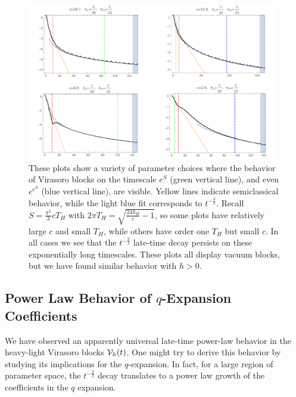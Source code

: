 \documentclass[12pt]{article}
\numberwithin{equation}{section}
\newcommand{\CV}{{\cal V}}
\begin{document}
\begin{figure}[h]
\begin{centering}
\includegraphics[width=0.98\textwidth]{VBlockESEES}
\caption{ These plots show a variety of parameter choices where the behavior of Virasoro blocks on the timescale $e^S$ (green vertical line), and even $e^{e^S}$ (blue vertical line), are visible.  Yellow lines indicate semiclassical behavior, while the light blue fit corresponds to $t^{-\frac{3}{2}}$.  Recall $S = \frac{\pi^2}{3} c T_H$ with $2 \pi T_H =  \sqrt{\frac{24 h_H}{c} - 1}$, so some plots have relatively large $c$ and small $T_H$, while others have order one $T_H$ but small $c$. In all cases we see that the $t^{-\frac{3}{2}}$ late-time decay persists on these exponentially long timescales.  These plots all display vacuum blocks, but we have found similar behavior with $h > 0$.}
\label{fig:VBlockESEES}
\end{centering}
\end{figure}

\subsection{Power Law Behavior of $q$-Expansion Coefficients}
\label{sec:CoeffPowerLaw}

We have observed an apparently universal late-time power-law behavior in the heavy-light Virasoro blocks $\CV_h(t)$.  One might try to derive this behavior by studying its implications for the $q$-expansion.  In fact, for a large region of parameter space, the $t^{-\frac{3}{2}}$ decay  translates to a power law growth of the coefficients in the $q$ expansion. 
\end{document}
